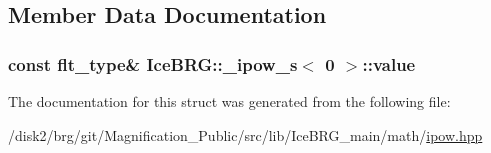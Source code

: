 \subsection{Member Data Documentation}
\hypertarget{structIceBRG_1_1__ipow__s_3_010_01_4_a84d3e49f8b0e52ccd7ff43c5d0cf91e1}{}
\subsubsection[{value}]{\setlength{\rightskip}{0pt plus 5cm}const {\bf flt\+\_\+type}\& {\bf Ice\+B\+R\+G\+::\+\_\+ipow\+\_\+s}$<$ 0 $>$\+::value}\label{structIceBRG_1_1__ipow__s_3_010_01_4_a84d3e49f8b0e52ccd7ff43c5d0cf91e1}


The documentation for this struct was generated from the following file\+:\begin{DoxyCompactItemize}
\item 
/disk2/brg/git/\+Magnification\+\_\+\+Public/src/lib/\+Ice\+B\+R\+G\+\_\+main/math/\hyperlink{ipow_8hpp}{ipow.\+hpp}\end{DoxyCompactItemize}
